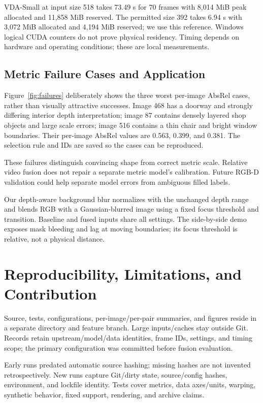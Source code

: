 \documentclass[10pt,twocolumn,letterpaper]{article}
\begin{document}
VDA-Small at input size 518 takes 73.49 s for 70 frames with 8,014 MiB peak allocated and 11,858 MiB reserved. The permitted size 392 takes 6.94 s with 3,072 MiB allocated and 4,194 MiB reserved; we use this reference. Windows logical CUDA counters do not prove physical residency. Timing depends on hardware and operating conditions; these are local measurements.

\subsection{Metric Failure Cases and Application}
Figure~\ref{fig:failures} deliberately shows the three worst per-image AbsRel cases, rather than visually attractive successes. Image 468 has a doorway and strongly differing interior depth interpretation; image 87 contains densely layered shop objects and large scale errors; image 516 contains a thin chair and bright window boundaries. Their per-image AbsRel values are 0.563, 0.399, and 0.381. The selection rule and IDs are saved so the cases can be reproduced.

These failures distinguish convincing shape from correct metric scale. Relative video fusion does not repair a separate metric model's calibration. Future RGB-D validation could help separate model errors from ambiguous filled labels.

Our depth-aware background blur normalizes with the unchanged depth range and blends RGB with a Gaussian-blurred image using a fixed focus threshold and transition. Baseline and fused inputs share all settings. The side-by-side demo exposes mask bleeding and lag at moving boundaries; its focus threshold is relative, not a physical distance.

\section{Reproducibility, Limitations, and Contribution}
Source, tests, configurations, per-image/per-pair summaries, and figures reside in a separate directory and feature branch. Large inputs/caches stay outside Git. Records retain upstream/model/data identities, frame IDs, settings, and timing scope; the primary configuration was committed before fusion evaluation.

Early runs predated automatic source hashing; missing hashes are not invented retrospectively. New runs capture Git/dirty state, source/config hashes, environment, and lockfile identity. Tests cover metrics, data axes/units, warping, synthetic behavior, fixed support, rendering, and archive claims.
\end{document}
